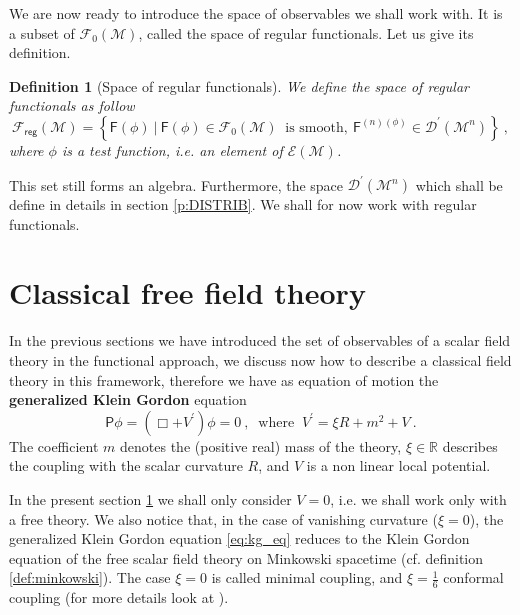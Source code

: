 \documentclass[11pt]{book}
\newcommand{\Dcal}{\mathcal{D}}
\newcommand{\Ecal}{\mathcal{E}}
\newcommand{\Fcal}{\mathcal{F}}
\newcommand{\Mcal}{\mathcal{M}}
\newcommand{\Rbb}{\mathbb{R}}
\newcommand{\Fsf}{\mathsf{F}}
\newcommand{\Psf}{\mathsf{P}}
\theoremstyle{break}
\newtheorem{definition}{Definition}[chapter]
\begin{document}
We are now ready to introduce the space of observables we shall work with. It is a subset of $\Fcal_0(\Mcal)$, called the space of regular functionals. Let us give its definition.


\begin{definition}[Space of regular functionals]\label{def:obs_reg}
We define the space of regular functionals as follow
%
\begin{equation*}
\Fcal_{\mathsf{reg}}(\Mcal) = \left\{ \Fsf(\phi) \ \bigg| \ \Fsf(\phi) \in \Fcal_0(\Mcal) \ \mbox{ is smooth}, \ \Fsf^{(n)(\phi)} \in \Dcal^\prime(\Mcal^{n}) \right\} \ ,
\end{equation*}
%
where $\phi$ is a test function, i.e. an element of $\Ecal(\Mcal)$.
\end{definition}

This set still forms an algebra. Furthermore, the space $\Dcal^\prime(\Mcal^{n})$ which shall be define in details in section \ref{p:DISTRIB}. We shall for now work with regular functionals. 


\section{Classical free field theory}\label{p:CLASSICAL}


In the previous sections we have introduced the set of observables of a scalar field theory in the functional approach, we discuss now how to describe a classical field theory in this framework, therefore we have as equation of motion the \textbf{generalized Klein Gordon} equation
%
\begin{equation} 
\Psf \phi = \left( \Box + V^\prime \right) \phi = 0 \ , \
\mbox{ where } \ V^\prime = \xi R + m^2 + V \ . 
\label{eq:kg_eq}
\end{equation}
%
The coefficient $m$ denotes the (positive real) mass of the theory, $\xi \in \Rbb$ describes the coupling with the scalar curvature $R$, and $V$ is a non linear local potential.


In the present section \ref{p:CLASSICAL} we shall only consider $V=0$, i.e. we shall work only with a free theory. We also notice that, in the case of vanishing curvature ($\xi=0$), the generalized Klein Gordon equation \eqref{eq:kg_eq} reduces to the Klein Gordon equation of the free scalar field theory on Minkowski spacetime (cf. definition \ref{def:minkowski}). The case $\xi=0$ is called minimal coupling, and $\xi=\frac16$ conformal coupling (for more details look at \cite{WALD_1984}).
\end{document}
